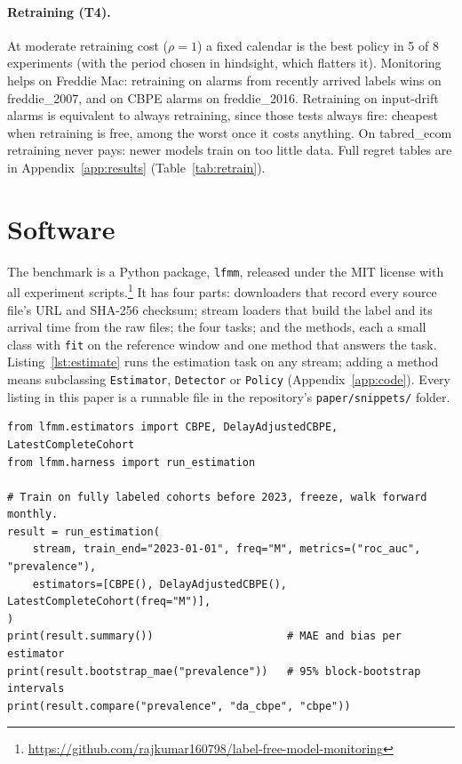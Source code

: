\documentclass[11pt]{article}
\begin{document}
\paragraph{Retraining (T4).} At moderate retraining cost ($\rho=1$) a fixed calendar is the best
policy in 5 of 8 experiments (with the period chosen in hindsight, which flatters it). Monitoring
helps on Freddie Mac: retraining on alarms from recently arrived labels wins on freddie\_2007, and
on CBPE alarms on freddie\_2016. Retraining on input-drift alarms is equivalent to always
retraining, since those tests always fire: cheapest when retraining is free, among the worst once
it costs anything. On tabred\_ecom retraining never pays: newer models train on too little data.
Full regret tables are in Appendix~\ref{app:results} (Table~\ref{tab:retrain}).

\section{Software}\label{sec:software}

The benchmark is a Python package, \texttt{lfmm}, released under the MIT license with all
experiment scripts.\footnote{\url{https://github.com/rajkumar160798/label-free-model-monitoring}}
It has four parts: downloaders that record every source file's URL and SHA-256 checksum; stream
loaders that build the label and its arrival time from the raw files; the four tasks; and the
methods, each a small class with \texttt{fit} on the reference window and one method that
answers the task. Listing~\ref{lst:estimate} runs the estimation task on any stream; adding a
method means subclassing \texttt{Estimator}, \texttt{Detector} or \texttt{Policy}
(Appendix~\ref{app:code}). Every listing in this paper is a runnable file in the repository's
\texttt{paper/snippets/} folder.

\begin{lstlisting}[caption={Estimating performance on a stream with delayed labels.}, label={lst:estimate}]
from lfmm.estimators import CBPE, DelayAdjustedCBPE, LatestCompleteCohort
from lfmm.harness import run_estimation

# Train on fully labeled cohorts before 2023, freeze, walk forward monthly.
result = run_estimation(
    stream, train_end="2023-01-01", freq="M", metrics=("roc_auc", "prevalence"),
    estimators=[CBPE(), DelayAdjustedCBPE(), LatestCompleteCohort(freq="M")],
)
print(result.summary())                     # MAE and bias per estimator
print(result.bootstrap_mae("prevalence"))   # 95% block-bootstrap intervals
print(result.compare("prevalence", "da_cbpe", "cbpe"))
\end{lstlisting}
\end{document}
